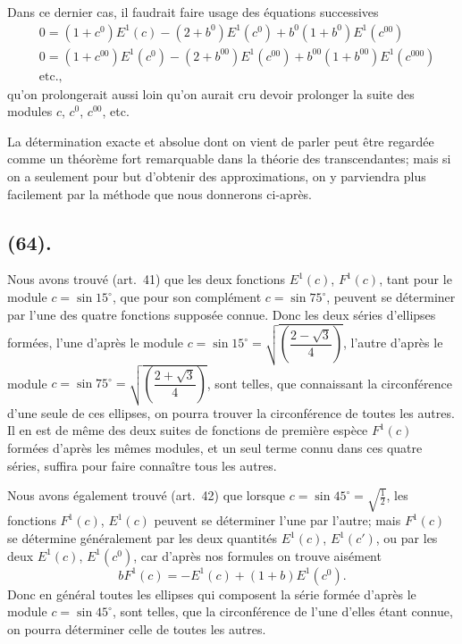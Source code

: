 \documentclass{article}
\begin{document}

Dans ce dernier cas, il faudrait faire usage des équations successives
\[ \begin{aligned} &0=(1+c^{0})E^{1}(c)-(2+b^{0})E^{1}(c^{0})+b^{0}(1+b^{0})E^{1}(c^{00})\\ &0=(1+c^{00})E^{1}(c^{0})-(2+b^{00})E^{1}(c^{00})+b^{00}(1+b^{00})E^{1}(c^{000})\\ &\text{etc.}, \end{aligned} \]
qu'on prolongerait aussi loin qu'on aurait cru devoir prolonger la suite des modules $c$, $c^{0}$, $c^{00}$, etc.

La détermination exacte et absolue dont on vient de parler peut être regardée comme un théorème fort remarquable dans la théorie des transcendantes; mais si on a seulement pour but d'obtenir des approximations, on y parviendra plus facilement par la méthode que nous donnerons ci-après.

\subsection*{(64).}

Nous avons trouvé (art.~41) que les deux fonctions $E^{1}(c)$, $F^{1}(c)$, tant pour le module $c=\sin15^{\circ}$, que pour son complément $c=\sin75^{\circ}$, peuvent se déterminer par l'une des quatre fonctions supposée connue. Donc les deux séries d'ellipses formées, l'une d'après le module $c=\sin15^{\circ}=\sqrt{\left(\dfrac{2-\sqrt{3}}{4}\right)}$, l'autre d'après le module $c=\sin75^{\circ}=\sqrt{\left(\dfrac{2+\sqrt{3}}{4}\right)}$, sont telles, que connaissant la circonférence d'une seule de ces ellipses, on pourra trouver la circonférence de toutes les autres. Il en est de même des deux suites de fonctions de première espèce $F^{1}(c)$ formées d'après les mêmes modules, et un seul terme connu dans ces quatre séries, suffira pour faire connaître tous les autres.

Nous avons également trouvé (art.~42) que lorsque $c=\sin45^{\circ}=\sqrt{\tfrac{1}{2}}$, les fonctions $F^{1}(c)$, $E^{1}(c)$ peuvent se déterminer l'une par l'autre; mais $F^{1}(c)$ se détermine généralement par les deux quantités $E^{1}(c)$, $E^{1}(c')$, ou par les deux $E^{1}(c)$, $E^{1}(c^{0})$, car d'après nos formules on trouve aisément
\[ bF^{1}(c)=-E^{1}(c)+(1+b)E^{1}(c^{0}). \]
Donc en général toutes les ellipses qui composent la série formée d'après le module $c=\sin45^{\circ}$, sont telles, que la circonférence de l'une d'elles étant connue, on pourra déterminer celle de toutes les autres.
\end{document}
